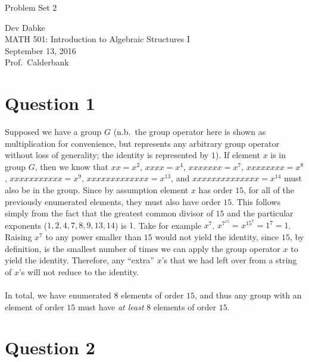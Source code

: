 \documentclass[letterpaper]{article}
\def\name{Problem Set 2}
\begin{document}
{\huge \name}


\vspace{0.25in}

Dev Dabke \\
MATH 501: Introduction to Algebraic Structures I \\
September 13, 2016 \\
Prof.\ Calderbank \\

\section{Question 1}
\label{sec:Question1}

Supposed we have a group $ G $ (n.b.\ the group operator here is shown as multiplication for convenience, but represents any arbitrary group operator without loss of generality; the identity is represented by $ 1 $).
If element $ x $ is in group $ G $, then we know that $ xx = x^2 $, $ xxxx = x^4 $, $ xxxxxxx = x^7 $, $ xxxxxxxx = x^8 $, $ xxxxxxxxxxx = x^9 $, $ xxxxxxxxxxxxx = x^{13} $, and $ xxxxxxxxxxxxxx = x^{14} $ must also be in the group.
Since by assumption element $ x $ has order $ 15 $, for all of the previously enumerated elements, they must also have order $ 15 $.
This follows simply from the fact that the greatest common divisor of $ 15 $ and the particular exponents ($ 1, 2, 4, 7, 8, 9, 13, 14 $) is $ 1 $.
Take for example $ x^7 $. $ x^{7^{15}} = x^{15^7} = 1^7 = 1 $.
Raising $ x^7 $ to any power smaller than $ 15 $ would not yield the identity, since $ 15 $, by definition, is the smallest number of times we can apply the group operator $ x $ to yield the identity.
Therefore, any ``extra'' $ x $'s that we had left over from a string of $ x $'s will not reduce to the identity.
\\ \\
In total, we have enumerated $ 8 $ elements of order $ 15 $, and thus any group with an element of order $ 15 $ must have \textit{at least} $ 8 $ elements of order $ 15 $.

\section{Question 2}
\label{sec:Question2}
\end{document}
